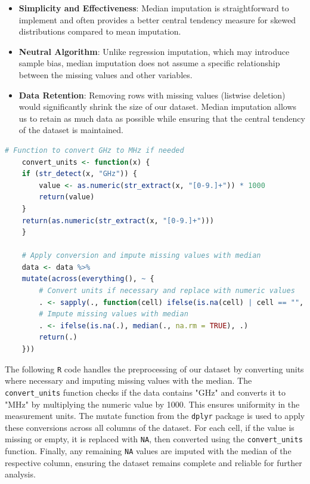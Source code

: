 \begin{itemize}
\item \textbf{Simplicity and Effectiveness}: Median imputation is straightforward to implement and often provides a better central tendency measure for skewed distributions compared to mean imputation.
\item \textbf{Neutral Algorithm}: Unlike regression imputation, which may introduce sample bias, median imputation does not assume a specific relationship between the missing values and other variables.
\item \textbf{Data Retention}: Removing rows with missing values (listwise deletion) would significantly shrink the size of our dataset. Median imputation allows us to retain as much data as possible while ensuring that the central tendency of the dataset is maintained.
\end{itemize}


\begin{lstlisting}[language=R]
    # Function to convert GHz to MHz if needed
    convert_units <- function(x) {
    if (str_detect(x, "GHz")) {
        value <- as.numeric(str_extract(x, "[0-9.]+")) * 1000
        return(value)
    }
    return(as.numeric(str_extract(x, "[0-9.]+")))
    }

    # Apply conversion and impute missing values with median
    data <- data %>%
    mutate(across(everything(), ~ {
        # Convert units if necessary and replace with numeric values
        . <- sapply(., function(cell) ifelse(is.na(cell) | cell == "", NA, convert_units(cell)))
        # Impute missing values with median
        . <- ifelse(is.na(.), median(., na.rm = TRUE), .)
        return(.)
    }))
\end{lstlisting}

The following \texttt{R} code handles the preprocessing of our dataset by converting units where necessary and imputing missing values with the median. The \texttt{convert\_units} function checks if the data contains "GHz" and converts it to "MHz" by multiplying the numeric value by 1000. This ensures uniformity in the measurement units. The mutate function from the \texttt{dplyr} package is used to apply these conversions across all columns of the dataset. For each cell, if the value is missing or empty, it is replaced with \texttt{NA}, then converted using the \texttt{convert\_units} function. Finally, any remaining \texttt{NA} values are imputed with the median of the respective column, ensuring the dataset remains complete and reliable for further analysis.

